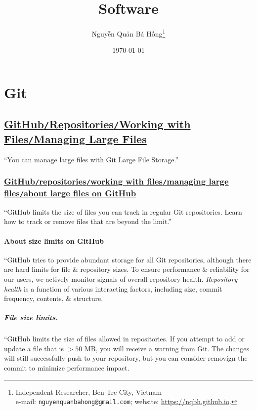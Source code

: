 \documentclass[oneside]{book}
\title{Software}
\author{\selectlanguage{vietnamese} Nguyễn Quản Bá Hồng\footnote{Independent Researcher, Ben Tre City, Vietnam\\e-mail: \texttt{nguyenquanbahong@gmail.com}; website: \url{https://nqbh.github.io}.}}
\date{\today}
\numberwithin{equation}{section}
\begin{document}
\frontmatter
\maketitle
\setcounter{secnumdepth}{4}
\setcounter{tocdepth}{3}
\tableofcontents
\newpage


\mainmatter
\chapter{Git}

\section{\href{https://docs.github.com/en/repositories/working-with-files/managing-large-files}{GitHub\texttt{/}Repositories\texttt{/}Working with Files\texttt{/}Managing Large Files}}
``You can manage large files with Git Large File Storage.''

\subsection{\href{https://docs.github.com/en/repositories/working-with-files/managing-large-files/about-large-files-on-github}{GitHub\texttt{/}repositories\texttt{/}working with files\texttt{/}managing large files\texttt{/}about large files on GitHub}}
``GitHub limits the size of files you can track in regular Git repositories. Learn how to track or remove files that are beyond the limit.''

\subsubsection{About size limits on GitHub}
``GitHub tries to provide abundant storage for all Git repositories, although there are hard limits for file \& repository sizes. To ensure performance \& reliability for our users, we actively monitor signals of overall repository health. \textit{Repository health} is a function of various interacting factors, including size, commit frequency, contents, \& structure.

\paragraph{File size limits.} ``GitHub limits the size of files allowed in repositories. If you attempt to add or update a file that is $> 50$ MB, you will receive a warning from Git. The changes will still successfully push to your repository, but you can consider removign the commit to minimize performance impact.
\end{document}
